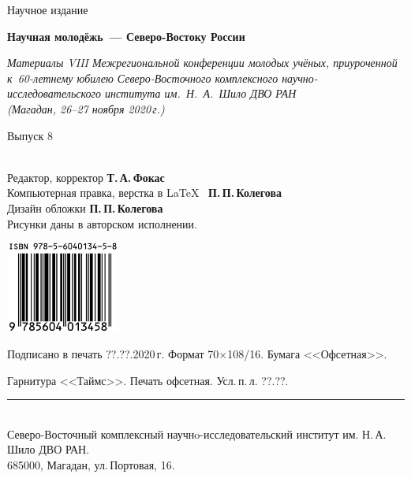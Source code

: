 \thispagestyle{empty}
\hspace{2cm}
\vfill
\begin{center}
  {Научное издание}

  \medskip
  \bigskip
  \textbf{\large Научная молодёжь~--- Северо-Востоку России}

  \medskip
  \textit{Материалы VIII Межрегиональной конференции молодых учёных, приуроченной к~60-летнему юбилею
  Северо-Восточного комплексного научно-исследовательского института им.~Н.~А.~Шило ДВО РАН\\ (Магадан,
  26--27 ноября 2020\,г.)}

  \vfill
  Выпуск 8
\end{center}
\vfill

\hspace{2cm}\\ \small
Редактор, корректор \textbf{Т.\,А.\,Фокас}\\
Компьютерная правка, верстка в \LaTeX~ \textbf{П.\,П.\,Колегова}\\
Дизайн обложки \textbf{П.\,П.\,Колегова}\\
Рисунки даны в авторском исполнении.

\vfill

\begin{center}
\includegraphics[height=30mm]{ISBN-978-5-6040134-5-8.jpg}
\end{center}


\enlargethispage{5\baselineskip}
\begin{changemargin}{-2cm}{-2cm}
\begin{center}
  \footnotesize
  Подписано в печать ??.??.2020\,г.  Формат 70$\times$108/16. Бумага
  <<Офсетная>>.\hspace*{2em}

  Гарнитура <<Таймс>>. Печать офсетная.  Усл.\,п.\,л. ??.??.
  \rule{1.1\textwidth}{.1mm}\\
  Северо-Восточный комплексный научнo-исследовательский институт им.
  Н.\,А.\,Шило ДВО РАН. \\ 685000, Магадан, ул.\,Портовая, 16.
\end{center}
\end{changemargin}
